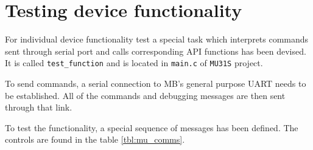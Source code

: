 \chapter{Testing device functionality}
\label{ch:testing_device_fun}

For individual device functionality test a special task which interprets commands sent through serial port and calls corresponding API functions has been devised. It is called \texttt{test\_function} and is located in \texttt{main.c} of \texttt{MU31S} project.

To send commands, a serial connection to MB's general purpose UART needs to be established. All of the commands and debugging messages are then sent through that link.

To test the functionality, a special sequence of messages has been defined. The controls are found in the table \ref{tbl:mu_comms}.

